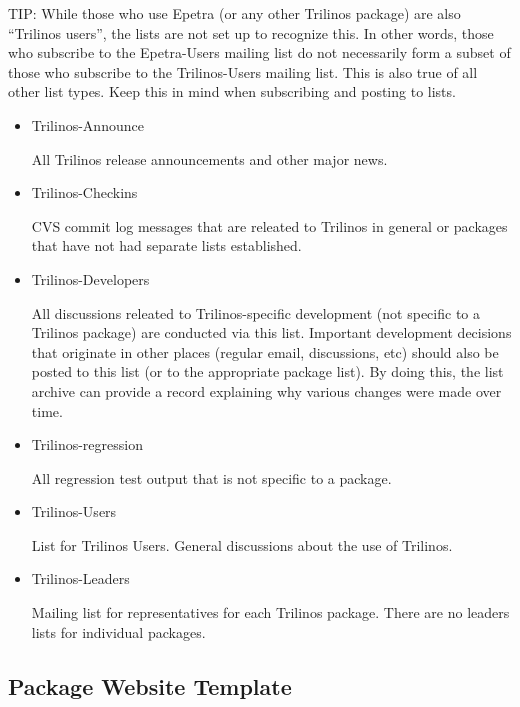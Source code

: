 \documentclass[12pt,relax]{TrilinosDevGuide}
\begin{document}
TIP: While those who use Epetra (or any other Trilinos package) are also
``Trilinos users'', the lists are not set up to recognize this.  In other 
words, those who subscribe to the Epetra-Users mailing list do not necessarily 
form a subset of those who subscribe to the Trilinos-Users mailing list.  This 
is also true of all other list types.  Keep this in mind when subscribing and 
posting to lists.
\begin{itemize}
\item Trilinos-Announce 

All Trilinos release announcements and other major news.

\item Trilinos-Checkins 

CVS commit log messages that are releated to Trilinos in general or packages 
that have not had separate lists established.

\item Trilinos-Developers 

All discussions releated to Trilinos-specific development (not specific to a 
Trilinos package) are conducted via this list.  Important development 
decisions that originate in other places (regular email, discussions, etc) 
should also be posted to this list (or to the appropriate package list).  
By doing this, the list archive can provide a record explaining why various 
changes were made over time.

\item Trilinos-regression 

All regression test output that is not specific to a package. 

\item Trilinos-Users 

List for Trilinos Users.  General discussions about the use of Trilinos.

\item Trilinos-Leaders

Mailing list for representatives for each Trilinos package.  There are no 
leaders lists for individual packages.
\end{itemize}

\subsection{Package Website Template}
\label{subsect:Website}
\end{document}
